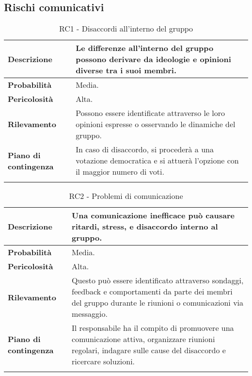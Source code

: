\subsection{Rischi comunicativi}
\begin{longtable}{ | l | p{10cm} | }
	\hline
	\textbf{Descrizione}          & Le differenze all'interno del gruppo possono derivare da ideologie e opinioni diverse tra i suoi membri.              \\
	\hline
	\textbf{Probabilità}          & Media.                                                                                                                \\
	\hline
	\textbf{Pericolosità}         & Alta.                                                                                                                 \\
	\hline
	\textbf{Rilevamento}          & Possono essere identificate attraverso le loro opinioni espresse o osservando le dinamiche del gruppo.                \\
	\hline
	\textbf{Piano di contingenza} & In caso di disaccordo, si procederà a una votazione democratica e si attuerà l'opzione con il maggior numero di voti. \\
	\hline
	\caption{RC1 - Disaccordi all'interno del gruppo}
	\label{table:8}
\end{longtable}

\begin{longtable}{ | l | p{10cm} | }
	\hline
	\textbf{Descrizione}          & Una comunicazione inefficace può causare ritardi, stress, e disaccordo interno al gruppo.                                                                       \\
	\hline
	\textbf{Probabilità}          & Media.                                                                                                                                                          \\
	\hline
	\textbf{Pericolosità}         & Alta.                                                                                                                                                           \\
	\hline
	\textbf{Rilevamento}          & Questo può essere identificato attraverso sondaggi, feedback e comportamenti da parte dei membri del gruppo durante le riunioni o comunicazioni via messaggio.  \\
	\hline
	\textbf{Piano di contingenza} & Il responsabile ha il compito di promuovere una comunicazione attiva, organizzare riunioni regolari, indagare sulle cause del disaccordo e ricercare soluzioni. \\
	\hline
	\caption{RC2 - Problemi di comunicazione}
	\label{table:9}
\end{longtable}
